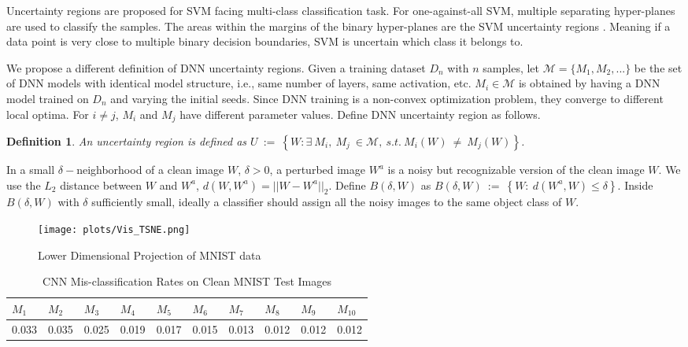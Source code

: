 \documentclass[12pt]{article}
\newtheorem{definition}{Definition}
\begin{document}
Uncertainty regions are proposed for SVM facing multi-class
classification task. For one-against-all SVM, multiple separating hyper-planes are used to
classify the samples. The areas within the margins of the binary 
hyper-planes are the SVM uncertainty regions 
\cite{svm-uncertain1,svm-uncertain2,svm-uncertain3,svm-uncertain4}.
Meaning if a data point is very close to multiple binary decision
boundaries, SVM is uncertain which class it belongs to.  

We propose a different definition of DNN uncertainty regions.
Given a training dataset $D_n$ with $n$ samples, let $\mathcal{M}=\{M_1, M_2, ...\}$ be
the set of DNN models with
identical model structure, i.e., same number of layers, same activation,
etc. $M_i \in \mathcal{M}$ is obtained by having a DNN model trained on
$D_n$ and varying the initial seeds. Since DNN 
training is a non-convex optimization problem, they converge to
different local optima. For $i \neq j$, $M_i$ and $M_j$ have
different parameter values. Define DNN uncertainty region as follows.  
%
\begin{definition}
An uncertainty region is defined as
$U~:=~\left\{W: \exists~ M_i,~M_j ~\in \mathcal{M},~ s.t.~M_i(W)~\neq ~M_j(W)\right\}$. 
\end{definition}
%
In a small $\delta-$neighborhood of a clean image $W$, $\delta >0$, 
a perturbed image $W^a$ is a noisy but
recognizable version of the clean image $W$. We use the $L_2$ distance
between $W$ and $W^a$, $d(W,W^a)=||W -W^a||_2$. Define $B(\delta,W)$ as 
$B(\delta,W)~:=~\left\{W:~ d(W^a,W) \leq \delta \right\}. $   
Inside $B(\delta,W)$ with $\delta$ sufficiently small, ideally a classifier
should assign all the noisy images to the same object class of $W$. 

%
\begin{figure}[tb]
\centering
\texttt{[image: plots/Vis\_TSNE.png]}
\caption{Lower Dimensional Projection of MNIST data}
\label{fig:2D}       
\end{figure}
%

%
\begin{table}[tb]
\centering
\caption{CNN Mis-classification Rates on Clean MNIST Test Images}
\label{tab:baseline}
\begin{center}
{\footnotesize  
\begin{tabular}{|llllllllll|}
\hline
$M_1$&$M_2$&$M_3$&$M_4$&$M_5$&$M_6$&$M_7$&$M_8$&$M_9$&$M_{10}$\\\hline 
0.033 & 0.035 & 0.025 & 0.019 & 0.017 & 0.015 & 0.013 & 0.012 & 0.012 & 0.012 \\
\hline 
\end{tabular} }
\end{center}
\end{table}
\end{document}
